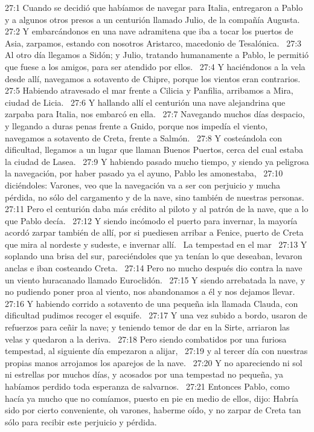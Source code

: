 27:1 Cuando se decidió que habíamos de navegar para Italia, entregaron a Pablo y a algunos otros presos a un centurión llamado Julio, de la compañía Augusta.  
27:2 Y embarcándonos en una nave adramitena que iba a tocar los puertos de Asia, zarpamos, estando con nosotros Aristarco, macedonio de Tesalónica.  
27:3 Al otro día llegamos a Sidón; y Julio, tratando humanamente a Pablo, le permitió que fuese a los amigos, para ser atendido por ellos.  
27:4 Y haciéndonos a la vela desde allí, navegamos a sotavento de Chipre, porque los vientos eran contrarios.  
27:5 Habiendo atravesado el mar frente a Cilicia y Panfilia, arribamos a Mira, ciudad de Licia.  
27:6 Y hallando allí el centurión una nave alejandrina que zarpaba para Italia, nos embarcó en ella.  
27:7 Navegando muchos días despacio, y llegando a duras penas frente a Gnido, porque nos impedía el viento, navegamos a sotavento de Creta, frente a Salmón.  
27:8 Y costeándola con dificultad, llegamos a un lugar que llaman Buenos Puertos, cerca del cual estaba la ciudad de Lasea.  
27:9 Y habiendo pasado mucho tiempo, y siendo ya peligrosa la navegación, por haber pasado ya el ayuno, Pablo les amonestaba,  
27:10 diciéndoles: Varones, veo que la navegación va a ser con perjuicio y mucha pérdida, no sólo del cargamento y de la nave, sino también de nuestras personas.  
27:11 Pero el centurión daba más crédito al piloto y al patrón de la nave, que a lo que Pablo decía.  
27:12 Y siendo incómodo el puerto para invernar, la mayoría acordó zarpar también de allí, por si puediesen arribar a Fenice, puerto de Creta que mira al nordeste y sudeste, e invernar allí.  
La tempestad en el mar  
27:13 Y soplando una brisa del sur, pareciéndoles que ya tenían lo que deseaban, levaron anclas e iban costeando Creta.  
27:14 Pero no mucho después dio contra la nave un viento huracanado llamado Euroclidón.  
27:15 Y siendo arrebatada la nave, y no pudiendo poner proa al viento, nos abandonamos a él y nos dejamos llevar.  
27:16 Y habiendo corrido a sotavento de una pequeña isla llamada Clauda, con dificultad pudimos recoger el esquife.  
27:17 Y una vez subido a bordo, usaron de refuerzos para ceñir la nave; y teniendo temor de dar en la Sirte, arriaron las velas y quedaron a la deriva.  
27:18 Pero siendo combatidos por una furiosa tempestad, al siguiente día empezaron a alijar,  
27:19 y al tercer día con nuestras propias manos arrojamos los aparejos de la nave.  
27:20 Y no apareciendo ni sol ni estrellas por muchos días, y acosados por una tempestad no pequeña, ya habíamos perdido toda esperanza de salvarnos.  
27:21 Entonces Pablo, como hacía ya mucho que no comíamos, puesto en pie en medio de ellos, dijo: Habría sido por cierto conveniente, oh varones, haberme oído, y no zarpar de Creta tan sólo para recibir este perjuicio y pérdida.  

